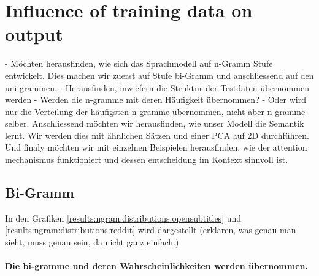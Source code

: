 \section{Influence of training data on output}
- Möchten herausfinden, wie sich das Sprachmodell auf n-Gramm Stufe entwickelt. Dies machen wir zuerst auf Stufe bi-Gramm und anschliessend auf den uni-grammen.
- Herausfinden, inwiefern die Struktur der Testdaten übernommen werden
	- Werden die n-gramme mit deren Häufigkeit übernommen?
	- Oder wird nur die Verteilung der häufigsten n-gramme übernommen, nicht aber n-gramme selber.
Anschliessend möchten wir herausfinden, wie unser Modell die Semantik lernt. Wir werden dies mit ähnlichen Sätzen und einer PCA auf 2D durchführen.
Und finaly möchten wir mit einzelnen Beispielen herausfinden, wie der attention mechanismus funktioniert und dessen entscheidung im Kontext sinnvoll ist.
\subsection{Bi-Gramm}
In den Grafiken \ref{results:ngram:distributions:opensubtitles} und \ref{results:ngram:distributions:reddit} wird dargestellt (erklären, was genau man sieht, muss genau sein, da nicht ganz einfach.)
\paragraph{Die bi-gramme und deren Wahrscheinlichkeiten werden übernommen.}
